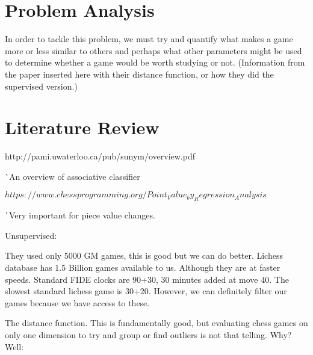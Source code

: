 \documentclass[12pt]{article}
\begin{document}
    \section{Problem Analysis}

    In order to tackle this problem, we must try and quantify what makes a game more or less similar to others and perhaps what other parameters might be used to determine whether a game would be worth studying or not. (Information from the paper inserted here with their distance function, or how they did the supervised version.)

    \section{Literature Review}

    http://pami.uwaterloo.ca/pub/sunym/overview.pdf

    ^^ An overview of associative classifier 

    $https://www.chessprogramming.org/Point_Value_by_Regression_Analysis$

    ^^ Very important for piece value changes.

    Unsupervised:

        They used only 5000 GM games, this is good but we can do better. Lichess database has 1.5 Billion games available to us. Although they are at faster speeds. Standard FIDE clocks are 90+30, 30 minutes added at move 40. The slowest standard lichess game is 30+20. However, we can definitely filter our games because we have access to these. 

        The distance function. This is fundamentally good, but evaluating chess games on only one dimension to try and group or find outliers is not that telling. Why? Well:
\end{document}
